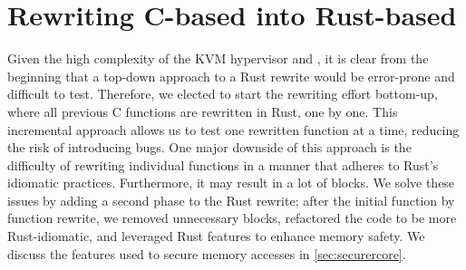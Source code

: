 \section{Rewriting C-based \secore{} into Rust-based \rustcore{}}

%

Given the high complexity of the KVM hypervisor and \secore{},
it is clear from the beginning that
a top-down approach to a Rust rewrite would be error-prone and difficult to test.
Therefore, we elected to start the rewriting effort bottom-up,
where all previous C functions are rewritten in Rust, one by one.
This incremental approach allows us to test one rewritten function at a time,
reducing the risk of introducing bugs.
One major downside of this approach is the difficulty of rewriting individual
functions in a manner that adheres to Rust's idiomatic practices.
Furthermore, it may result in a lot of  blocks.
We solve these issues by adding a second phase to the Rust rewrite;
after the initial function by function rewrite, we removed unnecessary
 blocks, refactored the code to be more Rust-idiomatic,
and leveraged Rust features to enhance \rustcore{} memory safety.
We discuss the features used to secure \rustcore{} memory accesses in
\autoref{sec:securercore}.


